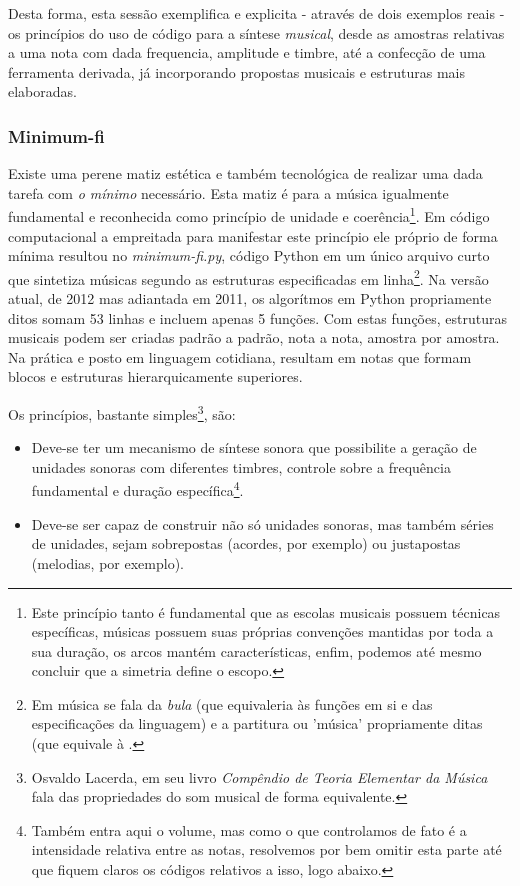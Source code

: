 Desta forma, esta sessão exemplifica e explicita - através de dois
exemplos reais - os princípios do uso de código para a síntese
\emph{musical}, desde as amostras relativas a uma nota com dada
frequencia, amplitude e timbre, até a confecção de uma ferramenta
derivada, já incorporando propostas musicais e estruturas mais
elaboradas.

\subsubsection{Minimum-fi}

Existe uma perene matiz estética e também tecnológica de realizar uma
dada tarefa com \emph{o mínimo} necessário.  Esta matiz é para a
música igualmente fundamental e reconhecida como princípio de unidade
e coerência\footnote{Este princípio tanto é fundamental que as escolas
  musicais possuem técnicas específicas, músicas possuem suas próprias
  convenções mantidas por toda a sua duração, os arcos mantém
  características, enfim, podemos até mesmo concluir que a simetria
  define o escopo.}. Em código computacional a empreitada para
manifestar este princípio ele próprio de forma mínima resultou no
\emph{minimum-fi.py}, código Python em um único arquivo curto que
sintetiza músicas segundo as estruturas especificadas em
linha\footnote{Em música se fala da \emph{bula} (que equivaleria às
  funções em si e das especificações da linguagem) e a partitura ou
  'música' propriamente ditas (que equivale à .}.  Na versão atual, de
2012 mas adiantada em 2011, os algorítmos em Python propriamente ditos
somam 53 linhas e incluem apenas 5 funções. Com estas funções,
estruturas musicais podem ser criadas padrão a padrão, nota a nota,
amostra por amostra. Na prática e posto em linguagem cotidiana,
resultam em notas que formam blocos e estruturas hierarquicamente
superiores.

Os princípios, bastante simples\footnote{Osvaldo Lacerda, em seu livro
  \emph{Compêndio de Teoria Elementar da Música} fala das propriedades
  do som musical de forma equivalente.}, são:
\begin{itemize}
  \item Deve-se ter um mecanismo de síntese sonora que possibilite a
    geração de unidades sonoras com diferentes timbres, controle sobre
    a frequência fundamental e duração específica\footnote{Também
      entra aqui o volume, mas como o que controlamos de fato é a
      intensidade relativa entre as notas, resolvemos por bem omitir
      esta parte até que fiquem claros os códigos relativos a isso,
      logo abaixo.}.
  \item Deve-se ser capaz de construir não só unidades sonoras, mas
    também séries de unidades, sejam sobrepostas (acordes, por
    exemplo) ou justapostas (melodias, por exemplo).
\end{itemize}

